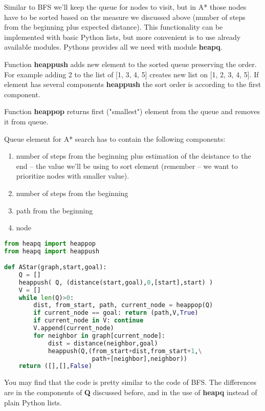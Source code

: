 Similar to BFS we'll keep the queue for nodes to visit, but in A*
those nodes have to be sorted based on the measure we discussed above
(number of steps from the beginning plus expected distance).
This functionality can be implemented with basic Python lists,
but more convenient is to use already available modules.
Pythons provides all we need with module \textbf{heapq}. 

Function \textbf{heappush} adds new element to the sorted queue 
preserving the order. For example adding 2 to the list of [1, 3, 4, 5]
creates new list on [1, 2, 3, 4, 5]. If element has several
components \textbf{heappush} the sort order is according to the
first component. 

Function \textbf{heappop} returns first ("smallest") element from
the queue and removes it from queue.

Queue element for A* search has to contain the following components:
\begin{enumerate}
\item number of steps from the beginning plus estimation of the deistance
to the end -- the value we'll be using to sort element (remember --
we want to prioritize nodes with smaller value).
\item number of steps from the beginning
\item path from the beginning
\item node
\end{enumerate}

\newpage

\begin{lstlisting}[language=Python,style=codelst2,caption={Python: A* search}]
from heapq import heappop
from heapq import heappush

def AStar(graph,start,goal):
    Q = []
    heappush( Q, (distance(start,goal),0,[start],start) )
    V = []
    while len(Q)>0:
        dist, from_start, path, current_node = heappop(Q)
        if current_node == goal: return (path,V,True)
        if current_node in V: continue
        V.append(current_node)
        for neighbor in graph[current_node]:
            dist = distance(neighbor,goal)
            heappush(Q,(from_start+dist,from_start+1,\
                        path+[neighbor],neighbor))
    return ([],[],False)
\end{lstlisting}

You may find that the code is pretty similar to the code of BFS.
The differences are in the components of \textbf{Q} discussed before,
and in the use of \textbf{heapq} instead of plain Python lists.

